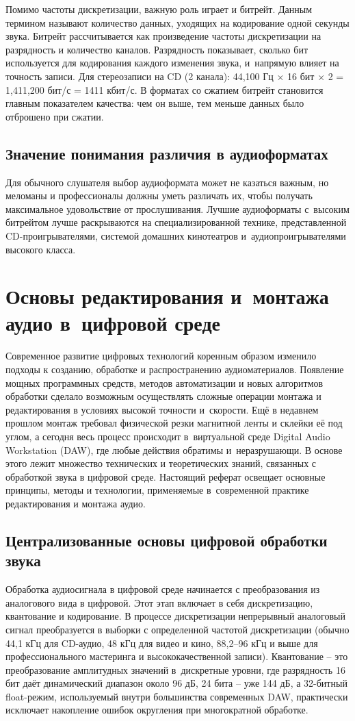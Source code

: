 \documentclass{ou}
\begin{document}
Помимо частоты дискретизации, важную роль играет и битрейт. Данным термином называют количество данных, уходящих на кодирование одной секунды звука. Битрейт рассчитывается как произведение частоты дискретизации на разрядность и количество каналов. Разрядность показывает, сколько бит используется для кодирования каждого изменения звука, и~напрямую влияет на точность записи. Для стереозаписи на CD (2 канала): 44,100 Гц × 16 бит × 2 = 1,411,200 бит/с = 1411 кбит/с. В форматах со сжатием битрейт становится главным показателем качества: чем он выше, тем меньше данных было отброшено при сжатии.
\subsection{Значение понимания различия в аудиоформатах}
Для обычного слушателя выбор аудиоформата может не казаться важным, но меломаны и профессионалы должны уметь различать их, чтобы получать максимальное удовольствие от прослушивания. Лучшие аудиоформаты с~высоким битрейтом лучше раскрываются на специализированной технике, представленной CD-проигрывателями, системой домашних кинотеатров и~аудиопроигрывателями высокого класса.
\newpage
\section{Основы редактирования и~монтажа аудио в~цифровой среде}
Современное развитие цифровых технологий коренным образом изменило подходы к созданию, обработке и распространению аудиоматериалов. Появление мощных программных средств, методов автоматизации и новых алгоритмов обработки сделало возможным осуществлять сложные операции монтажа и редактирования в условиях высокой точности и~скорости. Ещё в недавнем прошлом монтаж требовал физической резки магнитной ленты и склейки её под углом, а сегодня весь процесс происходит в~виртуальной среде Digital Audio Workstation (DAW), где любые действия обратимы и~неразрушающи. В основе этого лежит множество технических и теоретических знаний, связанных с обработкой звука в цифровой среде. Настоящий реферат освещает основные принципы, методы и технологии, применяемые в~современной практике редактирования и монтажа аудио.
\subsection{Централизованные основы цифровой обработки звука}
Обработка аудиосигнала в цифровой среде начинается с преобразования из аналогового вида в цифровой. Этот этап включает в себя дискретизацию, квантование и кодирование. В процессе дискретизации непрерывный аналоговый сигнал преобразуется в выборки с определенной частотой дискретизации (обычно 44,1 кГц для CD-аудио, 48 кГц для видео и кино, 88,2–96 кГц и выше для профессионального мастеринга и высококачественной записи). Квантование -- это преобразование амплитудных значений в~дискретные уровни, где разрядность 16 бит даёт динамический диапазон около 96 дБ, 24 бита -- уже 144 дБ, а 32-битный float-режим, используемый внутри большинства современных DAW, практически исключает накопление ошибок округления при многократной обработке.
\end{document}
